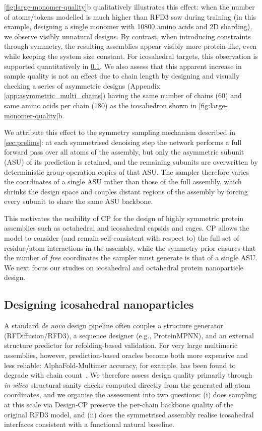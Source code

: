 \documentclass{article}
\theoremstyle{plain}
\theoremstyle{definition}
\theoremstyle{remark}
\begin{document}
\cref{fig:large-monomer-quality}b qualitatively illustrates this effect: when the number of atoms/tokens modelled is much higher than RFD3 saw during training (in this example, designing a single monomer with 10800 amino acids and 2D sharding), we observe visibly unnatural designs. By contrast, when introducing constraints through symmetry, the resulting assemblies appear visibly more protein-like, even while keeping the system size constant. For icosahedral targets, this observation is supported quantitatively in \cref{sec:results-quality}. We also assess that this apparent increase in sample quality is not an effect due to chain length by designing and visually checking a series of asymmetric designs (Appendix \cref{app:asymmetric_multi_chains}) having the same number of chains (60) and same amino acids per chain (180) as the icosahedron shown in \cref{fig:large-monomer-quality}b.

We attribute this effect to the symmetry sampling mechanism described in \cref{sec:prelims}: at each symmetrised denoising step the network performs a full forward pass over all atoms of the assembly, but only the asymmetric subunit (ASU) of its prediction is retained, and the remaining subunits are overwritten by deterministic group-operation copies of that ASU. The sampler therefore varies the coordinates of a single ASU rather than those of the full assembly, which shrinks the design space and couples distant regions of the assembly by forcing every subunit to share the same ASU backbone.

This motivates the usability of CP for the design of highly symmetric protein assemblies such as octahedral and icosahedral capsids and cages. CP allows the model to consider (and remain self-consistent with respect to) the full set of residue/atom interactions in the assembly, while the symmetry prior ensures that the number of \emph{free} coordinates the sampler must generate is that of a single ASU. We next focus our studies on icosahedral and octahedral protein nanoparticle design.



\subsection{Designing icosahedral nanoparticles}\label{sec:results-quality}

A standard \emph{de novo} design pipeline often couples a structure generator (RFDiffusion/RFD3), a sequence designer (e.g., ProteinMPNN), and an external structure predictor for refolding-based validation. For very large multimeric assemblies, however, prediction-based oracles become both more expensive and less reliable: AlphaFold-Multimer accuracy, for example, has been found to degrade with chain count~\cite{bryant_predicting_2022}. We therefore assess design quality primarily through \emph{in silico} structural sanity checks computed directly from the generated all-atom coordinates, and we organise the assessment into two questions: (i) does sampling at this scale via Design-CP preserve the per-chain backbone quality of the original RFD3 model, and (ii) does the symmetrised assembly realise icosahedral interfaces consistent with a functional natural baseline.
\end{document}
